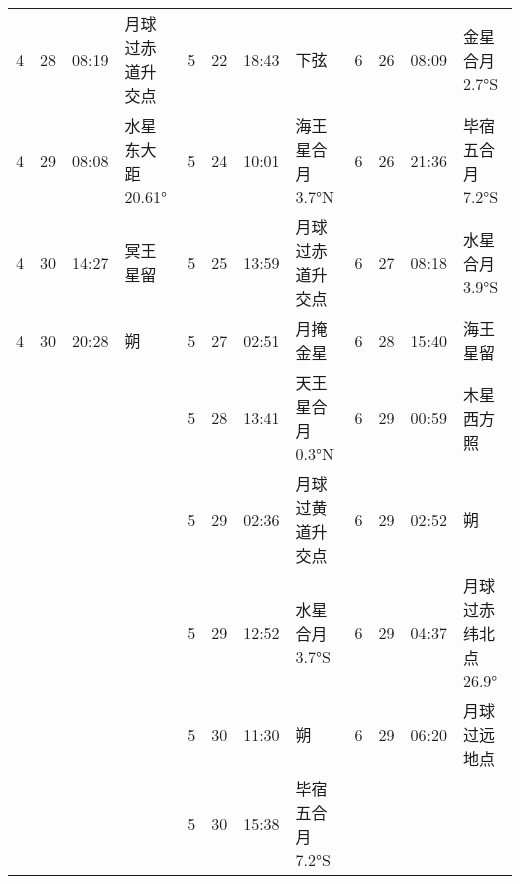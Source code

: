 \begin{tabular}{llll|llll|llll}
4 & 28 & 08:19 & 月球过赤道升交点 & 5 & 22 & 18:43 & 下弦 & 6 & 26 & 08:09 & 金星合月 2.7°S \tabularnewline
4 & 29 & 08:08 & 水星东大距 20.61° & 5 & 24 & 10:01 & 海王星合月 3.7°N & 6 & 26 & 21:36 & 毕宿五合月 7.2°S \tabularnewline
4 & 30 & 14:27 & 冥王星留 & 5 & 25 & 13:59 & 月球过赤道升交点 & 6 & 27 & 08:18 & 水星合月 3.9°S \tabularnewline
4 & 30 & 20:28 & 朔 & 5 & 27 & 02:51 & 月掩金星 & 6 & 28 & 15:40 & 海王星留 \tabularnewline
 &  &  &  & 5 & 28 & 13:41 & 天王星合月 0.3°N & 6 & 29 & 00:59 & 木星西方照 \tabularnewline
 &  &  &  & 5 & 29 & 02:36 & 月球过黄道升交点 & 6 & 29 & 02:52 & 朔 \tabularnewline
 &  &  &  & 5 & 29 & 12:52 & 水星合月 3.7°S & 6 & 29 & 04:37 & 月球过赤纬北点 26.9° \tabularnewline
 &  &  &  & 5 & 30 & 11:30 & 朔 & 6 & 29 & 06:20 & 月球过远地点 \tabularnewline
 &  &  &  & 5 & 30 & 15:38 & 毕宿五合月 7.2°S &  &  &  &  \tabularnewline
\hline \end{tabular}

